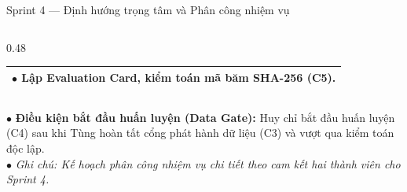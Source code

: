 \documentclass[aspectratio=169, 9pt]{beamer}
\begin{document}
\begin{frame}{Sprint 4 — Định hướng trọng tâm và Phân công nhiệm vụ}
\begin{columns}[T]
\begin{column}{0.48\textwidth}
{\begin{tabularx}{\linewidth}{>{\raggedright\arraybackslash}X}
        $\bullet$ Lập Evaluation Card, kiểm toán mã băm SHA-256 (C5). \\
        \bottomrule
      \end{tabularx}
      }
    \end{column}
  \end{columns}
  \vspace{0.1cm}
  {\fontsize{7.2pt}{9pt}\selectfont
  $\bullet$ \textbf{Điều kiện bắt đầu huấn luyện (Data Gate):} Huy chỉ bắt đầu huấn luyện (C4) sau khi Tùng hoàn tất cổng phát hành dữ liệu (C3) và vượt qua kiểm toán độc lập.\\[1pt]
  $\bullet$ \textit{\color{gray} Ghi chú: Kế hoạch phân công nhiệm vụ chi tiết theo cam kết hai thành viên cho Sprint 4.}
  }
\end{frame}
\end{document}
